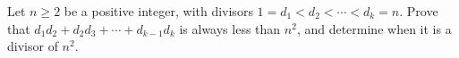 Let $n \geq 2$ be a positive integer, with divisors $1 = d_1 < d_2 < \cdots < d_k = n$. Prove that $d_1 d_2 + d_2 d_3 + \cdots + d_{k-1} d_k$ is always less than $n^2$, and determine when it is a divisor of $n^2$.
